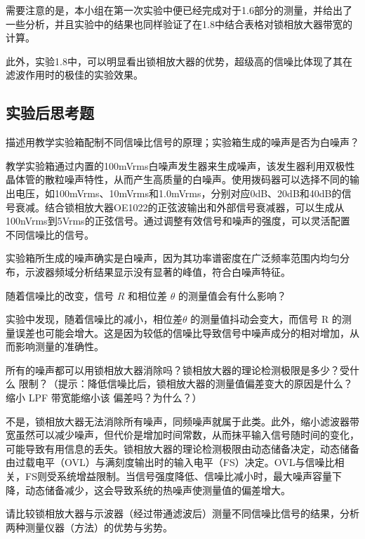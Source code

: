\documentclass[dvipsnames, svgnames,a4paper,11pt]{article}
\begin{document}
	需要注意的是，本小组在第一次实验中便已经完成对于1.6部分的测量，并给出了一些分析，并且实验中的结果也同样验证了在1.8中结合表格对锁相放大器带宽的计算。

	此外，实验1.8中，可以明显看出锁相放大器的优势，超级高的信噪比体现了其在滤波作用时的极佳的实验效果。

	
	
	
	\subsection{实验后思考题}
	
	\begin{question}
		描述用教学实验箱配制不同信噪比信号的原理；实验箱生成的噪声是否为白噪声？
		\end{question}
		教学实验箱通过内置的100mVrms白噪声发生器来生成噪声，该发生器利用双极性晶体管的散粒噪声特性，从而产生高质量的白噪声。使用拨码器可以选择不同的输出电压，如100mVrms、10mVrms和1.0mVrms，分别对应0dB、20dB和40dB的信号衰减。结合锁相放大器OE1022的正弦波输出和外部信号衰减器，可以生成从100nVrms到5Vrms的正弦信号。通过调整有效信号和噪声的强度，可以灵活配置不同信噪比的信号。
		
		实验箱所生成的噪声确实是白噪声，因为其功率谱密度在广泛频率范围内均匀分布，示波器频域分析结果显示没有显著的峰值，符合白噪声特征。
	\begin{question}
		随着信噪比的改变，信号 $R$ 和相位差 $\theta$ 的测量值会有什么影响？
	\end{question}
	实验中发现，随着信噪比的减小，相位差$\theta$  的测量值抖动会变大，而信号 R 的测量误差也可能会增大。这是因为较低的信噪比导致信号中噪声成分的相对增加，从而影响测量的准确性。
	\begin{question}
		所有的噪声都可以用锁相放大器消除吗？锁相放大器的理论检测极限是多少？受什么
限制？（提示：降低信噪比后，锁相放大器的测量值偏差变大的原因是什么？缩小 LPF 带宽能缩小该
偏差吗？为什么？）
	\end{question}
	不是，锁相放大器无法消除所有噪声，同频噪声就属于此类。此外，缩小滤波器带宽虽然可以减少噪声，但代价是增加时间常数，从而抹平输入信号随时间的变化，可能导致有用信息的丢失。锁相放大器的理论检测极限由动态储备决定，动态储备由过载电平（OVL）与满刻度输出时的输入电平（FS）决定。OVL与信噪比相关，FS则受系统增益限制。当信号强度降低、信噪比减小时，最大噪声容量下降，动态储备减少，这会导致系统的热噪声使测量值的偏差增大。
	
	\begin{question}
		请比较锁相放大器与示波器（经过带通滤波后）测量不同信噪比信号的结果，分析两种测量仪器（方法）的优势与劣势。
		\end{question}
		
\end{document}
